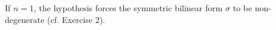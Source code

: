 If $n = 1$, the hypothesis forces the symmetric bilinear form $\sigma$ to be non-degenerate (cf. Exercise 2).
